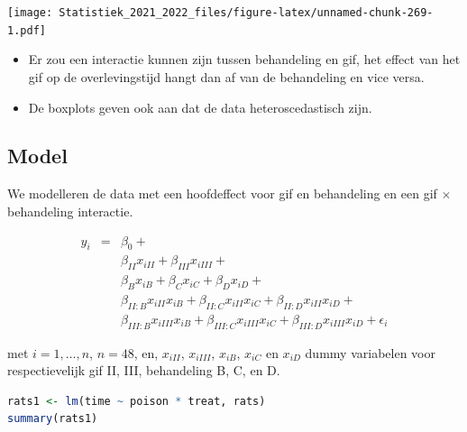 \documentclass[
  12pt,dutch,coursenotes]{book}
\providecommand{\tightlist}{%
  \setlength{\itemsep}{0pt}\setlength{\parskip}{0pt}}
\theoremstyle{definition}
\theoremstyle{definition}
\theoremstyle{definition}
\theoremstyle{definition}
\theoremstyle{remark}
\begin{document}
\texttt{[image: Statistiek\_2021\_2022\_files/figure-latex/unnamed-chunk-269-1.pdf]}

\begin{itemize}
\tightlist
\item
  Er zou een interactie kunnen zijn tussen behandeling en gif, het effect van het gif op de overlevingstijd hangt dan af van de behandeling en vice versa.
\item
  De boxplots geven ook aan dat de data heteroscedastisch zijn.
\end{itemize}

\hypertarget{model-4}{%
\subsection{Model}\label{model-4}}

We modelleren de data met een hoofdeffect voor gif en behandeling en een gif \(\times\) behandeling interactie.

\[
\begin{array}{lcl}
y_i &=& \beta_0  + \\
&&\beta_{II} x_{iII} + \beta_{III} x_{iIII} + \\
&& \beta_{B} x_{iB}  + \beta_{C} x_{iC} + \beta_{D} x_{iD} + \\
&&\beta_{II:B}x_{iII}x_{iB} + \beta_{II:C}x_{iII}x_{iC}  + \beta_{II:D}x_{iII}x_{iD} + \\
&&\beta_{III:B}x_{iIII}x_{iB} + \beta_{III:C}x_{iIII}x_{iC}  + \beta_{III:D}x_{iIII}x_{iD} +
\epsilon_i
\end{array}
\]

met \(i = 1, \ldots, n\), \(n=48\), en, \(x_{iII}\), \(x_{iIII}\), \(x_{iB}\), \(x_{iC}\) en \(x_{iD}\) dummy variabelen voor respectievelijk gif II, III, behandeling B, C, en D.

\begin{lstlisting}[language=R]
rats1 <- lm(time ~ poison * treat, rats)
summary(rats1)
\end{lstlisting}
\end{document}
